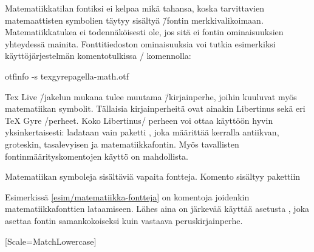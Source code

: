 \begin{koodilohkosis}
\usepackage[math-style=ISO]{unicode-math}
\end{koodilohkosis}

\noindent
Matematiikkatilan fontiksi ei kelpaa mikä tahansa, koska tarvittavien
matemaattisten symbolien täytyy sisältyä  \=/fontin
merkkivalikoimaan. Matematiikkatukea ei todennäköisesti ole, jos sitä ei
fontin ominaisuuksien yhteydessä mainita. Fonttitiedoston ominaisuuksia
voi tutkia esimerkiksi käyttöjärjestelmän komentotulkissa
\-/ komennolla:

\begin{koodilohkosis}
otfinfo -s texgyrepagella-math.otf
\end{koodilohkosis}

\noindent
Tex Live \=/jakelun mukana tulee muutama 
\=/kirjainperhe, joihin kuuluvat myös matematiikan symbolit. Tällaisia
kirjainperheitä ovat ainakin Libertinus sekä eri TeX Gyre \-/perheet.
Koko Libertinus\-/ perheen voi ottaa käyttöön hyvin yksinkertaisesti:
ladataan vain paketti , joka määrittää kerralla
antiikvan, groteskin, tasalevyisen ja matematiikkafontin. Myös
tavallisten fontinmäärityskomentojen käyttö on mahdollista.

\begin{esimerkki*}

\begin{koodilohko}
\end{koodilohko}

  \caption{Matematiikan symboleja sisältäviä vapaita fontteja. Komento
     sisältyy pakettiin }
  \label{esim/matematiikka-fontteja}
\end{esimerkki*}

Esimerkissä \ref{esim/matematiikka-fontteja} on komentoja joidenkin
matematiikkafonttien lataamiseen. Lähes aina on järkevää käyttää
asetusta , joka asettaa fontin
samankokoiseksi kuin vastaava peruskirjainperhe.

\begin{koodilohkosis}
[Scale=MatchLowercase]
\end{koodilohkosis}

